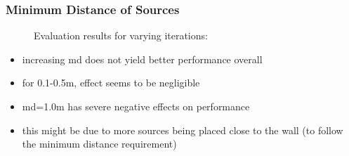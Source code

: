 \subsubsection{Minimum Distance of Sources}

\begin{figure}[H]
    \setlength\figureheight{7cm}
    \small
    \setlength\figurewidth{\textwidth}
	\centering
	\begin{tikzpicture}
	    \footnotesize
	    
	    
	\end{tikzpicture}
	
	\caption[Evaluation results for varying  iterations]{Evaluation results for varying  iterations: }
	\label{fig:trial1}
\end{figure}

\begin{itemize}
    \item increasing md does not yield better performance overall
    \item for 0.1-0.5m, effect seems to be negligible
    \item md=1.0m has severe negative effects on performance
    \item this might be due to more sources being placed close to the wall (to follow the minimum distance requirement)
\end{itemize}
